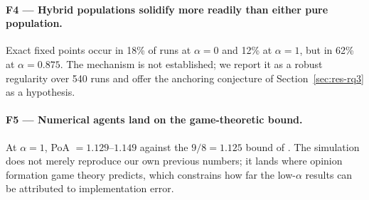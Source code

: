 \paragraph{F4 --- Hybrid populations solidify more readily than either pure population.}
Exact fixed points occur in 18\% of runs at $\alpha = 0$ and 12\% at $\alpha = 1$, but in
62\% at $\alpha = 0.875$. The mechanism is not established; we report it as a robust
regularity over 540 runs and offer the anchoring conjecture of
Section~\ref{sec:res-rq3} as a hypothesis.

\paragraph{F5 --- Numerical agents land on the game-theoretic bound.}
At $\alpha = 1$, PoA $= 1.129$--$1.149$ against the $9/8 = 1.125$ bound of
\citet{bhawalkar2013coevolutionary}. The simulation does not merely reproduce our own
previous numbers; it lands where opinion formation game theory predicts, which
constrains how far the low-$\alpha$ results can be attributed to implementation error.

\endgroup
